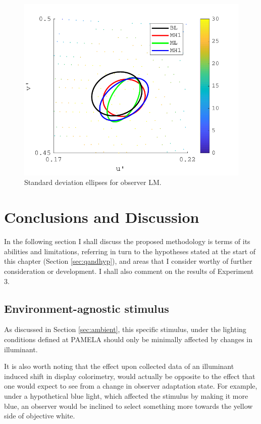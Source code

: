 \begin{figure}[hbtp]
\includegraphics[max width=\textwidth]{figs/tablet/PAMELA_20180205_Individual2.pdf} 
\caption{Standard deviation ellipses for observer LM.}
\label{fig:PAMELA_20180205_Individual2}
\end{figure}

\clearpage

\section{Conclusions and Discussion}

In the following section I shall discuss the proposed methodology is terms of its abilities and limitations, referring in turn to the hypotheses stated at the start of this chapter (Section \ref{sec:qandhyp}), and areas that I consider worthy of further consideration or development. I shall also comment on the results of Experiment 3.

\subsection{Environment-agnostic stimulus}

As discussed in Section \ref{sec:ambient}, this specific stimulus, under the lighting conditions defined at \gls{PAMELA} should only be minimally affected by changes in illuminant.

It is also worth noting that the effect upon collected data of an illuminant induced shift in display colorimetry, would actually be opposite to the effect that one would expect to see from a change in observer adaptation state. For example, under a hypothetical blue light, which affected the stimulus by making it more blue, an observer would be inclined to select something more towards the yellow side of objective white. 

